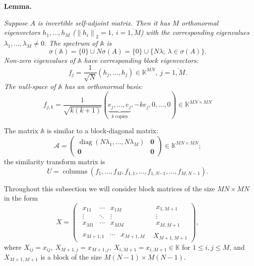 \documentclass[a4paper]{jpconf}
\begin{document}
\begin{center}
\textbf{Lemma.}
{\it
    Suppose \( A \) is invertible self-adjoint matrix.
    Then it has \( M \) orthonormal eigenvectors \( h_1, \ldots, h_M \)
    (\(\left\|h_i\right\|_2 = 1,\ i{=}\overline{1,M}\))
    with the corresponding eigenvalues
    \( \lambda_1, \ldots, \lambda_M \neq 0\).
    The spectrum of \( \mathbb{A} \) is
    \[
        \sigma(\mathbb{A}) = \{0\}\cup N\sigma(A) = \{0\} \cup \{N\lambda;\ \lambda\in\sigma(A) \}.
    \]
    Non-zero eigenvalues of \( \mathbb{A} \)
        have corresponding block eigenvectors:
    \[
        f_j = \frac{1}{\sqrt{N}} (h_j, \ldots, h_j)\in \mathbb{K}^{MN},\ j=\overline{1,M}.
    \]
    The null-space of \( \mathbb{A} \)
        has an orthonormal basis:
    \[
        f_{j,k} = \frac{1}{\sqrt{k(k+1)}}
        (
        \underbrace{e_j, \ldots, e_j}_{k\ \text{copies}},
        -ke_j,
        0, \ldots, 0
        ) \in\mathbb{K}^{{MN}{\times}{MN}}
    \]

    The matrix \( \mathbb{A} \) is similar to a block-diagonal matrix:
    \[
        \mathcal{A} =
        \left(\begin{array}{c|c}
            \operatorname{diag}(N\lambda_1,\ldots,N\lambda_M) & \mathbf{0} \\ \hline
            \mathbf{0} & \mathbf{0}
        \end{array}\right)\in\mathbb{K}^{{MN}{\times}{MN}};
    \]
    the similarity transform matrix is
    \[
        U = \operatorname{columns}
        \left(f_1, \ldots, f_M, f_{1,1}, \ldots, f_{1,N{-1}}, \ldots, f_{M,N{-}1}\right).
    \]
\/
}
\end{center}

Throughout this subsection
    we will consider block matrices
    of the size \( {MN}{\times}{MN} \)
    in the form
    \[
    X =
        \left(\begin{array}{c|c}
            \begin{matrix}
                x_{11} & \cdots & x_{1M} \\
                \vdots & \ddots & \vdots \\
                x_{M1} & \cdots & x_{MM}
            \end{matrix} &
            \begin{matrix}
                x_{1,M+1} \\
                \vdots \\
                x_{M,M+1}
            \end{matrix} \\ \hline
            \begin{matrix}
                x_{M+1,1} &
                \cdots &
                x_{M+1,M}
            \end{matrix} &
            X_{M+1,M+1}
        \end{array}\right),
    \]
where
\( X_{ij}      {=} x_{ij},
 \ X_{M{+}1,j} {=} x_{M{+}1,j},
 \ X_{i,M{+}1} {=} x_{i,M{+}1} \in \mathbb{K} \)
for \( 1 \leq {i,j} \leq M \),
and
\( X_{M{+}1,M{+}1} \) is a block of the size \( {M(N{-}1){\times}M(N-1)} \).
\end{document}
